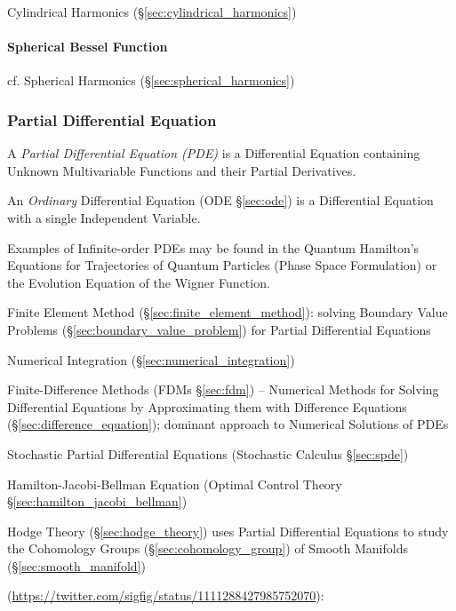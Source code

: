 \fist Cylindrical Harmonics (\S\ref{sec:cylindrical_harmonics})



\paragraph{Spherical Bessel Function}\label{sec:spherical_bessel}\hfill

\fist cf. Spherical Harmonics (\S\ref{sec:spherical_harmonics})



\subsubsection{Partial Differential Equation}\label{sec:pde}

A \emph{Partial Differential Equation (PDE)} is a Differential Equation
containing Unknown Multivariable Functions and their Partial Derivatives.

\fist An \emph{Ordinary} Differential Equation (ODE \S\ref{sec:ode}) is a
Differential Equation with a single Independent Variable.

Examples of Infinite-order PDEs may be found in the Quantum Hamilton's Equations
for Trajectories of Quantum Particles (Phase Space Formulation) or the Evolution
Equation of the Wigner Function.

Finite Element Method (\S\ref{sec:finite_element_method}): solving Boundary
Value Problems (\S\ref{sec:boundary_value_problem}) for Partial Differential
Equations

\fist Numerical Integration (\S\ref{sec:numerical_integration})

\fist Finite-Difference Methods (FDMs \S\ref{sec:fdm}) -- Numerical Methods for
Solving Differential Equations by Approximating them with Difference Equations
(\S\ref{sec:difference_equation}); dominant approach to Numerical Solutions of
PDEs

\fist Stochastic Partial Differential Equations (Stochastic Calculus
\S\ref{sec:spde})

\fist Hamilton-Jacobi-Bellman Equation (Optimal Control Theory
\S\ref{sec:hamilton_jacobi_bellman})

\fist Hodge Theory (\S\ref{sec:hodge_theory}) uses Partial Differential
Equations to study the Cohomology Groups (\S\ref{sec:cohomology_group}) of
Smooth Manifolds (\S\ref{sec:smooth_manifold})

(\url{https://twitter.com/sigfig/status/1111288427985752070}):

